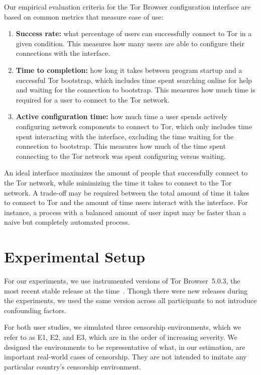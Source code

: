 \documentclass[USenglish,oneside,twocolumn]{article}
\begin{document}
Our empirical evaluation criteria for the Tor Browser configuration
interface are based on common metrics that measure ease of use: \\

\begin{enumerate}
    \item {\bfseries Success rate:} what percentage of users can successfully connect to Tor in a given condition. This measures how many users are able to configure their connections with the interface. 
    \item {\bfseries  Time to completion:} how long it takes between program startup and a successful Tor bootstrap, which includes time spent searching online for help and waiting for the connection to bootstrap. This measures how much time is required for a user to connect to the Tor network. 
    \item {\bfseries Active configuration time:} how much time a user spends actively configuring network components to connect to Tor, which only includes time spent interacting with the interface, excluding the time waiting for the connection to bootstrap. This measures how much of the time spent connecting to the Tor network was spent configuring versus waiting. 
\end{enumerate}

An ideal interface maximizes the amount of people that successfully connect to the Tor network, while minimizing the time it takes to connect to the Tor network. A trade-off may be required between the total amount of time it takes to connect to Tor and the amount of time users interact with the interface. For instance, a  process with a balanced amount of user input may be faster than a naive but completely automated process.

\section{Experimental Setup}
\label{sec:environments}
For our experiments, we use instrumented versions of Tor Browser~5.0.3, 
the most recent stable release at the time~\cite{torbrowser-503}.
Though there were new releases during the experiments,
we used the same version across all participants to not introduce
confounding factors.

For both user studies, we simulated three censorship environments,
which we refer to as E1, E2, and E3, which are in  the order of increasing severity.
We designed the environments to be representative
of what, in our estimation, are important real-world
cases of censorship. They are not intended to imitate
any particular country's censorship environment.\\
\end{document}
